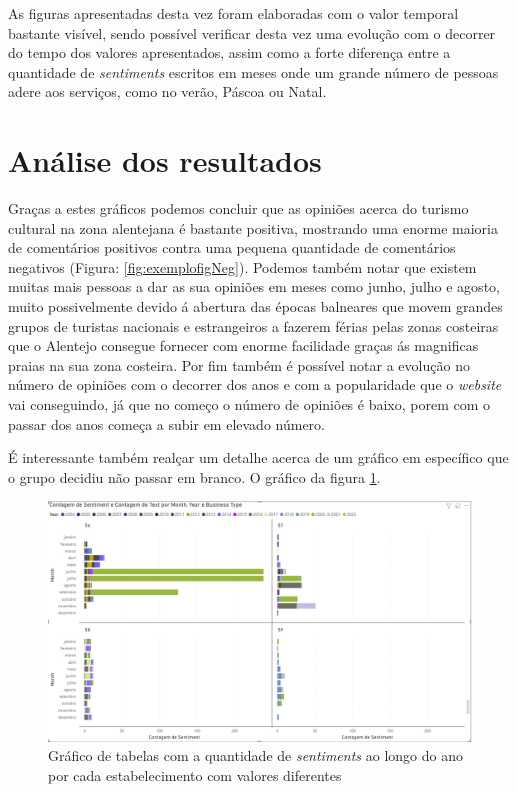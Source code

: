\newpage
As figuras apresentadas desta vez foram elaboradas com o valor temporal bastante visível, sendo possível verificar desta vez uma evolução com o decorrer do tempo dos valores apresentados, assim como a forte diferença entre a quantidade de \textit{sentiments} escritos em meses onde um grande número de pessoas adere aos serviços, como no verão, Páscoa ou Natal.
\newpage

\section {Análise dos resultados}

Graças a estes gráficos podemos concluir que as opiniões acerca do turismo cultural na zona alentejana é bastante positiva, mostrando uma enorme maioria de comentários positivos contra uma pequena quantidade de comentários negativos (Figura: \ref{fig:exemplofigNeg}). Podemos também notar que existem muitas mais pessoas a dar as sua opiniões em meses como junho, julho e agosto, muito possivelmente devido á abertura das épocas balneares que movem grandes grupos de turistas nacionais e estrangeiros a fazerem férias pelas zonas costeiras que o Alentejo consegue fornecer com enorme facilidade graças ás magnificas praias na sua zona costeira. Por fim também é possível notar a evolução no número de opiniões com o decorrer dos anos e com a popularidade que o \textit{website} vai conseguindo, já que no começo o número de opiniões é baixo, porem com o passar dos anos começa a subir em elevado número.

É interessante também realçar um detalhe acerca de um gráfico em específico que o grupo decidiu não passar em branco. O gráfico da figura \ref{fig:exemplofigStrange}.

\begin{figure}[!htb]
\centering
\includegraphics[width=12cm]{figuras/NrReviewsPerYear&BusinessType/9.PNG}
\caption{Gráfico de tabelas com a quantidade de \textit{sentiments} ao longo do ano por cada estabelecimento com valores diferentes}
\label{fig:exemplofigStrange}
\end{figure}

